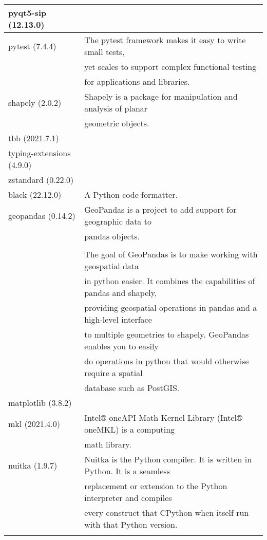 \begin{longtable}{|l|l|}
	pyqt5-sip (12.13.0)           &                 \\ \hline
	pytest (7.4.4)                & The pytest framework makes it easy to write small tests,
	\\ & yet scales to support complex functional testing
	\\ & for applications and libraries. \\ \hline
	shapely (2.0.2)               & Shapely is a package for manipulation and analysis of planar 
	\\ & geometric objects. \\ \hline
	tbb (2021.7.1)                &                 \\ \hline
	typing-extensions (4.9.0)     &                 \\ \hline
	zstandard (0.22.0)            &                 \\ \hline
	black (22.12.0)               & A Python code formatter. \\ \hline
	geopandas (0.14.2)            & GeoPandas is a project to add support for geographic data to 
	\\ & pandas objects.
	\\ & 
	\\ & The goal of GeoPandas is to make working with geospatial data 
	\\ & in python easier. It combines the capabilities of pandas and shapely, 
	\\ & providing geospatial operations in pandas and a high-level interface 
	\\ & to multiple geometries to shapely. GeoPandas enables you to easily 
	\\ & do operations in python that would otherwise require a spatial 
	\\ & database such as PostGIS.                \\ \hline
	matplotlib (3.8.2)            &                 \\ \hline
	mkl (2021.4.0)                & Intel® oneAPI Math Kernel Library (Intel® oneMKL) is a computing 
	\\ & math library. \\ \hline
	nuitka (1.9.7)                & Nuitka is the Python compiler. It is written in Python. It is a seamless
	\\ & replacement or extension to the Python interpreter and compiles 
	\\ & every construct that CPython when itself run with that Python version.
	\\ &

\end{longtable}
